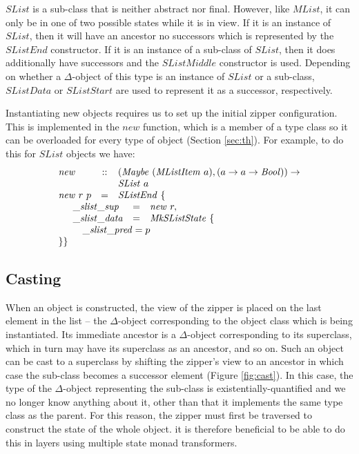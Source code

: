 $\mathit{SList}$ is a sub-class that is neither abstract nor final. However, like $\mathit{MList}$, it can only be in one of two possible states while it is in view. If it is an instance of $\mathit{SList}$, then it will have an ancestor no successors which is represented by the $\mathit{SListEnd}$ constructor. If it is an instance of a sub-class of $\mathit{SList}$, then it does additionally have successors and the $\mathit{SListMiddle}$ constructor is used. Depending on whether a $\Delta$-object of this type is an instance of $\mathit{SList}$ or a sub-class, $\mathit{SListData}$ or $\mathit{SListStart}$ are used to represent it as a successor, respectively.

Instantiating new objects requires us to set up the initial zipper configuration. This is implemented in the $\mathit{new}$ function, which is a member of a type class so it can be overloaded for every type of object (Section \ref{sec:th}). For example, to do this for $\mathit{SList}$ objects we have:
\begin{displaymath}
\begin{array}{lcl}
\mathit{new} & :: & (\mathit{Maybe}~(\mathit{MListItem}~a), (a \to a \to \mathit{Bool})) \to \\
&&\mathit{SList}~a \\
\mathit{new}~r~p & = & \mathit{SListEnd}~\{ \\
\multicolumn{3}{l}{\quad \begin{array}{lcl}
    \_\mathit{slist}\_\mathit{sup} & = & \mathit{new}~r, \\
    \_\mathit{slist}\_\mathit{data} & = & \mathit{MkSListState}~\{\\
    \multicolumn{3}{l}{\quad \_\mathit{slist}\_\mathit{pred} = p}\\ 
    \end{array}} \\
\}\} &&
\end{array}
\end{displaymath}

\subsection{Casting}

When an object is constructed, the view of the zipper is placed on the last element in the list -- the $\Delta$-object corresponding to the object class which is being instantiated. Its immediate ancestor is a $\Delta$-object corresponding to its superclass, which in turn may have its superclass as an ancestor, and so on. Such an object can be cast to a superclass by shifting the zipper's view to an ancestor in which case the sub-class becomes a successor element (Figure \ref{fig:cast}). In this case, the type of the $\Delta$-object representing the sub-class is existentially-quantified and we no longer know anything about it, other than that it implements the same type class as the parent. For this reason, the zipper must first be traversed to construct the state of the whole object. it is therefore beneficial to be able to do this in layers using multiple state monad transformers.

